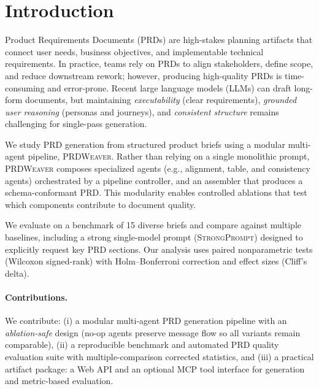 \section{Introduction}
\label{sec:intro}

Product Requirements Documents (PRDs) are high-stakes planning artifacts that connect user needs, business objectives, and implementable technical requirements.
In practice, teams rely on PRDs to align stakeholders, define scope, and reduce downstream rework; however, producing high-quality PRDs is time-consuming and error-prone.
Recent large language models (LLMs) can draft long-form documents, but maintaining \emph{executability} (clear requirements), \emph{grounded user reasoning} (personas and journeys), and \emph{consistent structure} remains challenging for single-pass generation.

We study PRD generation from structured product briefs using a modular multi-agent pipeline, \textsc{PRDWeaver}.
Rather than relying on a single monolithic prompt, \textsc{PRDWeaver} composes specialized agents (e.g., alignment, table, and consistency agents) orchestrated by a pipeline controller, and an assembler that produces a schema-conformant PRD.
This modularity enables controlled ablations that test which components contribute to document quality.

We evaluate on a benchmark of 15 diverse briefs and compare against multiple baselines, including a strong single-model prompt (\textsc{StrongPrompt}) designed to explicitly request key PRD sections.
Our analysis uses paired nonparametric tests (Wilcoxon signed-rank) with Holm--Bonferroni correction and effect sizes (Cliff's delta).

\paragraph{Contributions.}
We contribute:
(i) a modular multi-agent PRD generation pipeline with an \emph{ablation-safe} design (no-op agents preserve message flow so all variants remain comparable),
(ii) a reproducible benchmark and automated PRD quality evaluation suite with multiple-comparison corrected statistics,
and (iii) a practical artifact package: a Web API and an optional MCP tool interface for generation and metric-based evaluation.


